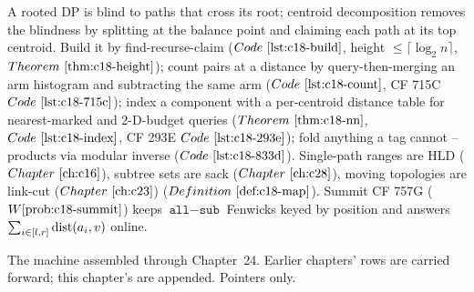 \begin{recallbox}
A rooted DP is blind to paths that cross its root; centroid decomposition removes the blindness by
splitting at the balance point and claiming each path at its top centroid. Build it by
find-recurse-claim (\(\coderef{c18-build}\), height \(\le\lceil\log_2 n\rceil\), \(\thmref{c18-height}\));
count pairs at a distance by query-then-merging an arm histogram and subtracting the same arm
(\(\coderef{c18-count}\), CF 715C \(\coderef{c18-715c}\)); index a component with a per-centroid
distance table for nearest-marked and 2-D-budget queries (\(\thmref{c18-nn}\), \(\coderef{c18-index}\),
CF 293E \(\coderef{c18-293e}\)); fold anything a tag cannot -- products via modular inverse
(\(\coderef{c18-833d}\)). Single-path ranges are HLD (\(\chref{c16}\)), subtree sets are sack
(\(\chref{c28}\)), moving topologies are link-cut (\(\chref{c23}\)) (\(\defref{c18-map}\)). Summit CF
757G (\(\probref{c18-summit}\)) keeps \(\texttt{all}-\texttt{sub}\) Fenwicks keyed by position and
answers \(\sum_{i\in[l,r]}\operatorname{dist}(a_i,v)\) online.
\end{recallbox}


The machine assembled through Chapter~24. Earlier chapters' rows are carried forward; this
chapter's are appended. Pointers only.

